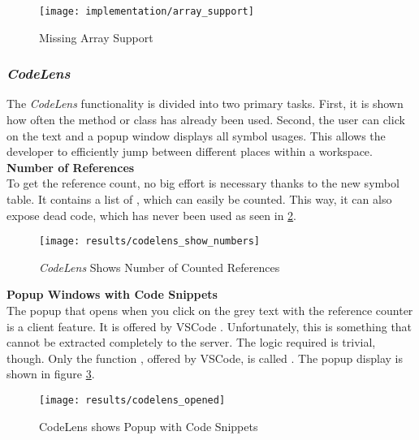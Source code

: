 \begin{figure}[H]
    \centering
    \texttt{[image: implementation/array\_support]}
    \caption{Missing Array Support}
    \label{fig:array_support}
\end{figure}

\subsubsection{\textit{CodeLens}}
\label{section:implementation:features:codelens}
The \textit{CodeLens} functionality is divided into two primary tasks.
First, it is shown how often the method or class has already been used.
Second, the user can click on the text and a popup window displays all symbol usages.
This allows the developer to efficiently jump between different places within a workspace.\\

\textbf{Number of References} \\
To get the reference count, no big effort is necessary thanks to the new symbol table.
It contains a list of , which can easily be counted.
This way, it can also expose dead code, which has never been used as seen in \ref{fig:codelens_show_ref_number}. \\

\begin{figure}[H]
    \centering
    \texttt{[image: results/codelens\_show\_numbers]}
    \caption{\textit{CodeLens} Shows Number of Counted References}
    \label{fig:codelens_show_ref_number}
\end{figure}

\textbf{Popup Windows with Code Snippets} \\
The popup that opens when you click on the grey text
with the reference counter is a client feature.
It is offered by VSCode \cite{vscodeAPI}.
Unfortunately, this is something that cannot be extracted completely to the server.
The logic required is trivial, though.
Only the function ,
offered by VSCode, is called \cite{vscodeAPI}.
The popup display is shown in figure \ref{fig:codelens_show_popup}. \\

\begin{figure}[H]
    \centering
    \texttt{[image: results/codelens\_opened]}
    \caption{CodeLens shows Popup with Code Snippets}
    \label{fig:codelens_show_popup}
\end{figure}

